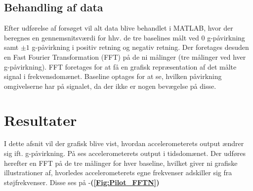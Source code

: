 \subsection{Behandling af data}
Efter udførelse af forsøget vil alt data blive behandlet i MATLAB, hvor der beregnes en gennemsnitsværdi for hhv. de tre baselines målt ved $0$ g-påvirkning samt $\pm1$ g-påvirkning i positiv retning og negativ retning. Der foretages desuden en Fast Fourier Transformation (FFT) på de ni målinger (tre målinger ved hver g-påvirkning). FFT foretages for at få en grafisk repræsentation af det målte signal i frekvensdomænet. Baseline optages for at se, hvilken påvirkning omgivelserne har på signalet, da der ikke er nogen bevægelse på disse.

\section{Resultater}\label{Sec_Pilot_Data}
I dette afsnit vil der grafisk blive vist, hvordan accelerometerets output ændrer sig ift. g-påvirkning. På  ses accelerometerets output i tidsdomænet. Der udføres herefter en FFT på de tre målinger for hver baseline, hvilket giver ni grafiske illustrationer af, hvorledes accelerometerets egne frekvenser adskiller sig fra støjfrekvenser. Disse ses på -\textbf{(\ref{Fig:Pilot_FFTN})}

